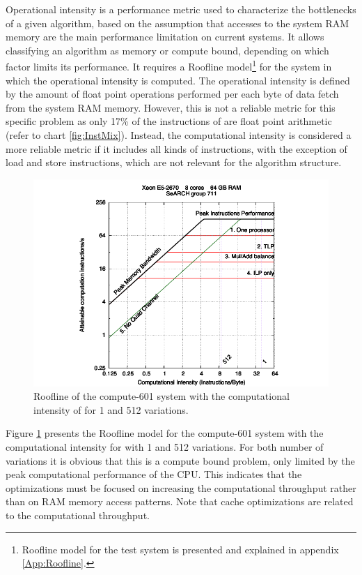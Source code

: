 Operational intensity \cite{Roofline} is a performance metric used to characterize the bottlenecks of a given algorithm, based on the assumption that accesses to the system RAM memory are the main performance limitation on current systems. It allows classifying an algorithm as memory or compute bound, depending on which factor limits its performance. It requires a Roofline model\footnote{Roofline model for the test system is presented and explained in appendix \ref{App:Roofline}.} for the system in which the operational intensity is computed. The operational intensity is defined by the amount of float point operations performed per each byte of data fetch from the system RAM memory. However, this is not a reliable metric for this specific problem as only 17\% of the instructions of \ttDilepKinFit are float point arithmetic (refer to chart \ref{fig:InstMix}). Instead, the computational intensity is considered a more reliable metric if it includes all kinds of instructions, with the exception of load and store instructions, which are not relevant for the algorithm structure.

\begin{figure}[!htp]
	\begin{center}
		\includegraphics[scale=1]{../../common/601_papi.pdf}  
		\caption{Roofline of the compute-601 system with the computational intensity of \ttDilepKinFit for 1 and 512 variations.}
		\label{fig:Roofline}
	\end{center}
\end{figure}

Figure \ref{fig:Roofline} presents the Roofline model for the compute-601 system with the computational intensity for \ttDilepKinFit with 1 and 512 variations. For both number of variations it is obvious that this is a compute bound problem, only limited by the peak computational performance of the CPU. This indicates that the optimizations must be focused on increasing the computational throughput rather than on RAM memory access patterns. Note that cache optimizations are related to the computational throughput.

